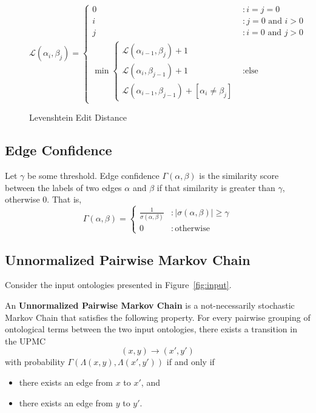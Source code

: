 \documentclass[letterpaper,twocolumn,12pt]{article}
\begin{document}
\begin{figure*}
\centering
\begin{equation*}
\mathcal{L} 
\left( \alpha_i, \beta_j \right) = \left\{
	\begin{array}{ll}
   	 	0 &: i=j=0 \\
		i &: j = 0 \text{ and } i > 0 \\
		j &: i = 0 \text{ and } j > 0 \\
		\min 
			\left\{ 
			\begin{array}{l}
				\mathcal{L} \left( \alpha_{i-1}, \beta_j \right) + 1 \\
          		        \mathcal{L} \left( \alpha_i, \beta_{j-1} \right) + 1 \\
          		        \mathcal{L} \left( \alpha_{i-1}, \beta_{j-1} \right) + [\alpha_i \neq \beta_j]
			\end{array} \right. &: \text{else}
     \end{array}
\right.
\end{equation*}
\caption{Levenshtein Edit Distance}
\end{figure*}

\subsection{Edge Confidence}

\begin{defn}
Let $\gamma$ be some threshold. Edge confidence $\Gamma \left( \alpha, \beta \right)$ is the similarity score between the labels of two edges $\alpha$ and $\beta$ if that similarity is greater than $\gamma$, otherwise $0$. That is,
$$ \Gamma \left( \alpha, \beta \right) = \left\{
   	 \begin{array}{ll}
           \frac{1}{\sigma \left( \alpha, \beta \right)} & : \vert \sigma \left( \alpha, \beta \right) \vert \geq \gamma \\
           0                                             & : \mathrm{otherwise}
     \end{array}
   \right.$$
\end{defn}

\subsection{Unnormalized Pairwise Markov Chain}

Consider the input ontologies presented in Figure~\ref{fig:input}.

\begin{defn}
An {\bf Unnormalized Pairwise Markov Chain} is a not-necessarily stochastic Markov Chain that satisfies the following property.
For every pairwise grouping of ontological terms between the two input ontologies, there exists a transition in the UPMC
$$ (x, y) \rightarrow (x', y') $$
with probability $\Gamma(\Lambda(x, y), \Lambda(x', y'))$ if and only if
\begin{itemize}
\item there exists an edge from $x$ to $x'$, and
\item there exists an edge from $y$ to $y'$.
\end{itemize}
\end{defn}
\end{document}

